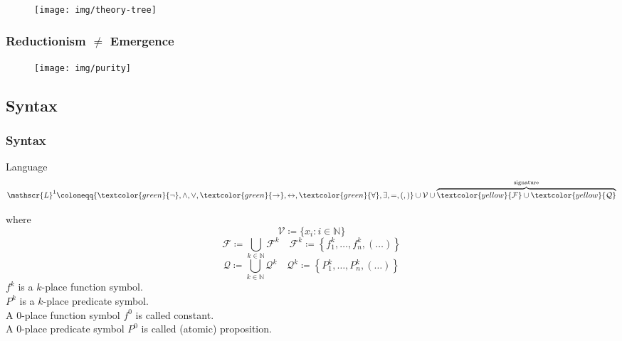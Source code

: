 \documentclass[UTF8,aspectratio=43,11pt,colorlinks,compress,openany]{beamer}%
\begin{document}
\begin{frame}\frametitle{}
	\begin{figure}
		\texttt{[image: img/theory-tree]}
	\end{figure}
\end{frame}

\begin{frame}\frametitle{Reductionism $\ne$ Emergence}
	\begin{figure}
		\texttt{[image: img/purity]}
	\end{figure}
\end{frame}

\subsection{Syntax}

\begin{frame}\frametitle{Syntax}
		\begin{block}{Language}
			\[\mathscr{L}^1\coloneqq \{\textcolor{green}{\neg},\wedge,\vee,\textcolor{green}{\to},\leftrightarrow,\textcolor{green}{\forall},\exists,=,(,)\}\cup\mathcal{V}\cup\overbrace{\textcolor{yellow}{\mathcal{F}}\cup\textcolor{yellow}{\mathcal{Q}}}^{\text{signature}}\]
		\end{block}
		where
		\[\mathcal{V}\coloneqq \{x_i: i\in\mathbb{N}\}\]
		\[\mathcal{F}\coloneqq \bigcup\limits_{k\in\mathbb{N}}\mathcal{F}^k\quad \mathcal{F}^k\coloneqq \left\{f_1^k,\dots,f_n^k,(\dots)\right\}\]
		\[\mathcal{Q}\coloneqq \bigcup\limits_{k\in\mathbb{N}}\mathcal{Q}^k\quad \mathcal{Q}^k\coloneqq \left\{P_1^k,\dots,P_n^k,(\dots)\right\}\]
		$f^k$ is a $k$-place function symbol.\\
		$P^k$ is a $k$-place predicate symbol.\\
		A $0$-place function symbol $f^0$ is called constant.\\
		A $0$-place predicate symbol $P^0$ is called (atomic) proposition.
\end{frame}
\end{document}

